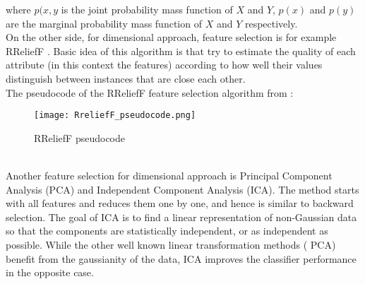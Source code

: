 where $p(x,y$ is the joint probability mass function of $X$ and $Y$, $p(x)$ and $p(y)$ are the marginal probability mass function of $X$ and $Y$ respectively.
\\ \indent
On the other side, for dimensional approach, feature selection is for example RReliefF \cite{robnik2003theoretical}. Basic idea of this algorithm is that try to estimate the quality of each attribute (in this context the features) according to how well their values distinguish between instances that are close each other.
\\
The pseudocode of the RReliefF feature selection algorithm from \cite{robnik2003theoretical}:
\begin{figure}[h]
    \centering
    \texttt{[image: RreliefF\_pseudocode.png]} 
	\caption{RReliefF pseudocode}
    \label{fig:RreliefF_pseudocode}
\end{figure}
\\ \indent
Another feature selection for dimensional approach is Principal Component Analysis (PCA) and Independent Component Analysis (ICA). The method starts with all features and reduces them one by one, and hence is similar to backward selection. The goal of ICA is to find a linear representation of non-Gaussian data so that the components are statistically independent, or as independent as possible. While the other well known linear transformation methods ( PCA) benefit from the gaussianity of the data, ICA improves the classifier performance in the opposite case.


